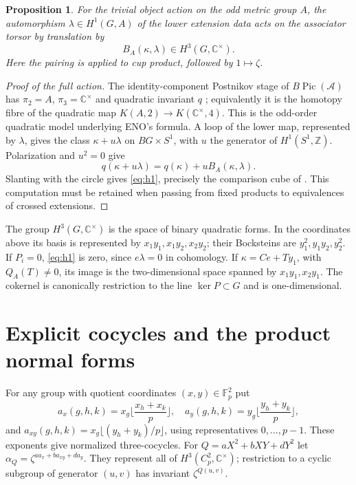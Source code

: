 \documentclass[11pt]{amsart}
\newtheorem{proposition}[theorem]{Proposition}
\theoremstyle{definition}\newtheorem{definition}[theorem]{Definition}
\newcommand{\Fp}{\mathbb F_p}
\newcommand{\C}{\mathbb C}
\newcommand{\cA}{\mathcal A}
\begin{document}
\begin{proposition}\label{prop:h1}
For the trivial object action on the odd metric group $A$, the automorphism
$\lambda\in H^1(G,A)$ of the lower extension data acts on the associator
torsor by translation by
\begin{equation}\label{eq:h1}
B_A(\kappa,\lambda)\in H^3(G,\C^\times).
\end{equation}
Here the pairing is applied to cup product, followed by $1\mapsto\zeta$.
\end{proposition}
\begin{proof}[Proof of the full action]
The identity-component Postnikov stage of $B\operatorname{Pic}(\cA)$ has
$\pi_2=A$, $\pi_3=\C^\times$ and quadratic invariant $q$
\cite[Propositions 7.3 and 7.6]{ENO}; equivalently it is
the homotopy fibre of the quadratic map
$K(A,2)\to K(\C^\times,4)$. This is the odd-order quadratic model underlying
ENO's formula. A loop of the lower map, represented by $\lambda$, gives the
class $\kappa+u\lambda$ on $BG\times S^1$, with $u$ the generator of
$H^1(S^1,\mathbb Z)$. Polarization and $u^2=0$ give
\[
q(\kappa+u\lambda)=q(\kappa)+uB_A(\kappa,\lambda).
\]
Slanting with the circle gives \eqref{eq:h1}, precisely the comparison cube
of \cite[Proposition 2.24]{DN}. This computation must be retained when
passing from fixed products to equivalences of crossed extensions.
\end{proof}

The group $H^3(G,\C^\times)$ is the space of binary quadratic forms. In the
coordinates above its basis is represented by $x_1y_1,x_1y_2,x_2y_2$; their
Bocksteins are $y_1^2,y_1y_2,y_2^2$.
If $P_i=0$, \eqref{eq:h1} is zero, since $e\lambda=0$ in cohomology.
If $\kappa=C e+T y_1$, with $Q_A(T)\ne0$, its image is the two-dimensional
space spanned by $x_1y_1,x_2y_1$. The cokernel is canonically restriction to
the line $\ker P\subset G$ and is one-dimensional.

\section{Explicit cocycles and the product normal forms}
For any group with quotient coordinates $(x,y)\in\Fp^2$ put
\[
a_x(g,h,k)=x_g\Big\lfloor\frac{x_h+x_k}{p}\Big\rfloor,\quad
a_y(g,h,k)=y_g\Big\lfloor\frac{y_h+y_k}{p}\Big\rfloor,
\]
and $a_{xy}(g,h,k)=x_g\lfloor(y_h+y_k)/p\rfloor$, using representatives
$0,\ldots,p-1$. These exponents give normalized three-cocycles.
For $Q=aX^2+bXY+dY^2$ let $\alpha_Q=\zeta^{aa_x+ba_{xy}+da_y}$.
They represent all of $H^3(C_p^2,\C^\times)$; restriction to a cyclic subgroup
of generator $(u,v)$ has invariant $\zeta^{Q(u,v)}$.
\end{document}

